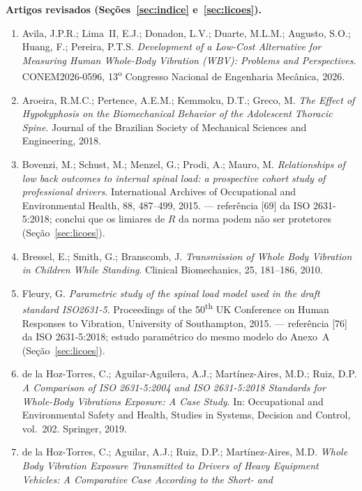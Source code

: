 \documentclass[11pt,a4paper]{article}
\begin{document}
\vspace{1em}
\noindent\textbf{Artigos revisados (Seções~\ref{sec:indice} e~\ref{sec:licoes}).}\;
\begin{enumerate}\itemsep2pt
\item Avila, J.P.R.; Lima~II, E.J.; Donadon, L.V.; Duarte, M.L.M.; Augusto,
      S.O.; Huang, F.; Pereira, P.T.S. \emph{Development of a Low-Cost
      Alternative for Measuring Human Whole-Body Vibration (WBV): Problems and
      Perspectives}. CONEM2026-0596, 13\textsuperscript{o} Congresso Nacional
      de Engenharia Mecânica, 2026.
\item Aroeira, R.M.C.; Pertence, A.E.M.; Kemmoku, D.T.; Greco, M. \emph{The
      Effect of Hypokyphosis on the Biomechanical Behavior of the Adolescent
      Thoracic Spine}. Journal of the Brazilian Society of Mechanical Sciences
      and Engineering, 2018.
\item Bovenzi, M.; Schust, M.; Menzel, G.; Prodi, A.; Mauro, M.
      \emph{Relationships of low back outcomes to internal spinal load: a
      prospective cohort study of professional drivers}. International
      Archives of Occupational and Environmental Health, 88, 487--499, 2015.
      --- referência [69] da ISO 2631-5:2018; conclui que os limiares de $R$
      da norma podem não ser protetores (Seção~\ref{sec:licoes}).
\item Bressel, E.; Smith, G.; Branscomb, J. \emph{Transmission of Whole Body
      Vibration in Children While Standing}. Clinical Biomechanics, 25,
      181--186, 2010.
\item Fleury, G. \emph{Parametric study of the spinal load model used in the
      draft standard ISO2631-5}. Proceedings of the 50\textsuperscript{th}
      UK Conference on Human Responses to Vibration, University of
      Southampton, 2015. --- referência [76] da ISO 2631-5:2018; estudo
      paramétrico do mesmo modelo do Anexo~A (Seção~\ref{sec:licoes}).
\item de la Hoz-Torres, C.; Aguilar-Aguilera, A.J.; Martínez-Aires, M.D.;
      Ruiz, D.P. \emph{A Comparison of ISO 2631-5:2004 and ISO 2631-5:2018
      Standards for Whole-Body Vibrations Exposure: A Case Study}. In:
      Occupational and Environmental Safety and Health, Studies in Systems,
      Decision and Control, vol.~202. Springer, 2019.
\item de la Hoz-Torres, C.; Aguilar, A.J.; Ruiz, D.P.; Martínez-Aires, M.D.
      \emph{Whole Body Vibration Exposure Transmitted to Drivers of Heavy
      Equipment Vehicles: A Comparative Case According to the Short- and
}
\end{enumerate}
\end{document}
